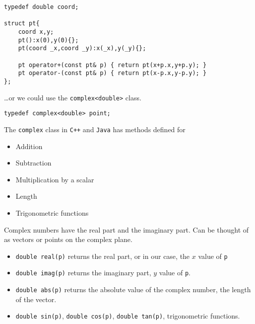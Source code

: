 \documentclass[12pt,t]{beamer}
\newcommand{\bi}{\begin{itemize}}
\newcommand{\ei}{\end{itemize}}
\begin{document}
\begin{frame}[fragile]
  \begin{verbatim}
typedef double coord;

struct pt{
    coord x,y;
    pt():x(0),y(0){};
    pt(coord _x,coord _y):x(_x),y(_y){};

    pt operator+(const pt& p) { return pt(x+p.x,y+p.y); }
    pt operator-(const pt& p) { return pt(x-p.x,y-p.y); }
};

  \end{verbatim}
\end{frame}

\begin{frame}[fragile]
  \vspace{20pt}
  \ldots or we could use the \texttt{complex<double>} class.
  \begin{verbatim}
typedef complex<double> point;
  \end{verbatim}
  \vspace{10pt}
  The \texttt{complex} class in \texttt{C++} and \texttt{Java} has methods defined for
  \bi
    \item Addition
    \item Subtraction
    \item Multiplication by a scalar
    \item Length
    \item Trigonometric functions
  \ei
\end{frame}

\begin{frame}[fragile]
  \vspace{20pt}
  Complex numbers have the real part and the imaginary part. Can be thought of
  as vectors or points on the complex plane.
  \bi
    \item \texttt{double real(p)} returns the real part, or in our case, the $x$ value
      of \texttt{p}
    \item \texttt{double imag(p)} returns the imaginary part, $y$ value of \texttt{p}.
    \item \texttt{double abs(p)} returns the absolute value of the complex number, the
      length of the vector.
    \item \texttt{double sin(p)}, \texttt{double cos(p)}, \texttt{double tan(p)}, trigonometric
      functions.
  \ei
\end{frame}
\end{document}
